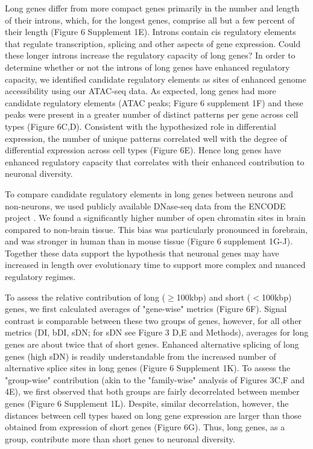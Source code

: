 Long genes differ from more compact genes primarily in the number and length of their introns, which, for the longest genes, comprise all but a few percent of their length (Figure 6 Supplement 1E). Introns contain cis regulatory elements that regulate transcription, splicing and other aspects of gene expression\citep{Rebollo_2012,Friedli_2015}. Could these longer introns increase the regulatory capacity of long genes? In order to determine whether or not the introns of long genes have enhanced regulatory capacity, we identified candidate regulatory elements as sites of enhanced genome accessibility using our ATAC-seq data. As expected, long genes had more candidate regulatory elements (ATAC peaks; Figure 6 supplement 1F) and these peaks were present in a greater number of distinct patterns per gene across cell types (Figure 6C,D). Consistent with the hypothesized role in differential expression, the number of unique patterns correlated well with the degree of differential expression across cell types (Figure 6E). Hence long genes have enhanced regulatory capacity that correlates with their enhanced contribution to neuronal diversity.

To compare candidate regulatory elements in long genes between neurons and non-neurons, we used publicly available DNase-seq data from the ENCODE project \citep{Dunham_2012}. We found a significantly higher number of open chromatin sites in brain compared to non-brain tissue. This bias was particularly pronounced in forebrain, and was stronger in human than in mouse tissue (Figure 6 supplement 1G-J). Together these data support the hypothesis that neuronal genes may have increased in length over evolutionary time to support more complex and nuanced regulatory regimes. 

To assess the relative contribution of long ($\geq$100kbp) and short ($<$100kbp) genes, we first calculated averages of "gene-wise" metrics (Figure 6F). Signal contrast is comparable between these two groups of genes, however, for all other metrics (DI, bDI, sDN; for sDN see Figure 3 D,E and Methods), averages for long genes are about twice that of short genes. Enhanced alternative splicing of long genes (high sDN) is readily understandable from the increased number of alternative splice sites in long genes (Figure 6 Supplement 1K). To assess the "group-wise" contribution (akin to the "family-wise" analysis of Figures 3C,F and 4E), we first observed that both groups are fairly decorrelated between member genes (Figure 6 Supplement 1L). Despite, similar decorrelation, however, the distances between cell types based on long gene expression are larger than those obtained from expression of short genes (Figure 6G). Thus, long genes, as a group, contribute more than short genes to neuronal diversity. 








